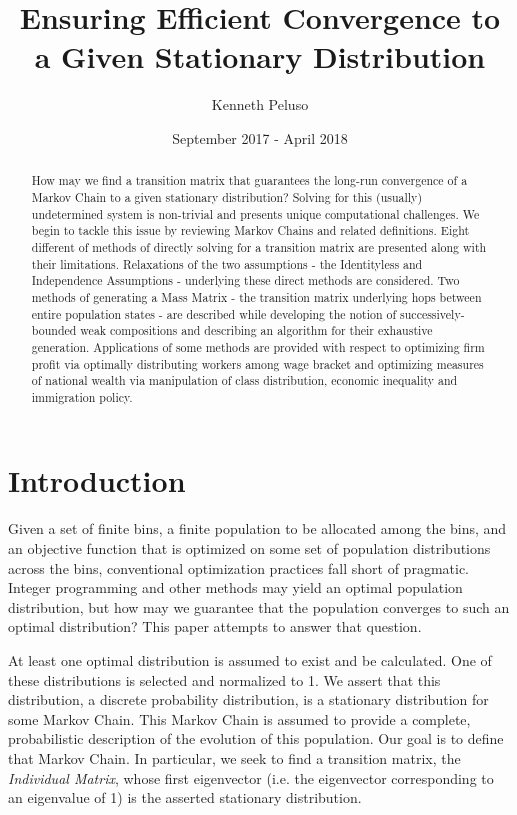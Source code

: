 \documentclass{article}
\title{Ensuring Efficient Convergence to a Given Stationary Distribution}
\author{Kenneth Peluso}
\date{September 2017 - April 2018}
\begin{document}
\maketitle
\begin{abstract}
   How may we find a transition matrix that guarantees the long-run convergence of a Markov Chain to a given stationary distribution? Solving for this (usually) undetermined system is non-trivial and presents unique computational challenges. We begin to tackle this issue by reviewing Markov Chains and related definitions. Eight different of methods of directly solving for a transition matrix are presented along with their limitations. Relaxations of the two assumptions - the Identityless and Independence Assumptions - underlying these direct methods are considered. Two methods of generating a Mass Matrix - the transition matrix underlying hops between entire population states - are described while developing the notion of successively-bounded weak compositions and describing an algorithm for their exhaustive generation. Applications of some methods are provided with respect to optimizing firm profit via optimally distributing workers among wage bracket and optimizing measures of national wealth via manipulation of class distribution, economic inequality and immigration policy.
\end{abstract}
\section{Introduction}
Given a set of finite bins, a finite population to be allocated among the bins, and an objective function that is optimized on some set of population distributions across the bins, conventional optimization practices fall short of pragmatic. Integer programming and other methods may yield an optimal population distribution, but how may we guarantee that the population converges to such an optimal distribution? This paper attempts to answer that question.

At least one optimal distribution is assumed to exist and be calculated. One of these distributions is selected and normalized to 1. We assert that this distribution, a discrete probability distribution, is a stationary distribution for some Markov Chain. This Markov Chain is assumed to provide a complete, probabilistic description of the evolution of this population. Our goal is to define that Markov Chain. In particular, we seek to find a transition matrix, the \textit{Individual Matrix}, whose first eigenvector (i.e. the eigenvector corresponding to an eigenvalue of 1) is the asserted stationary distribution.
\end{document}
